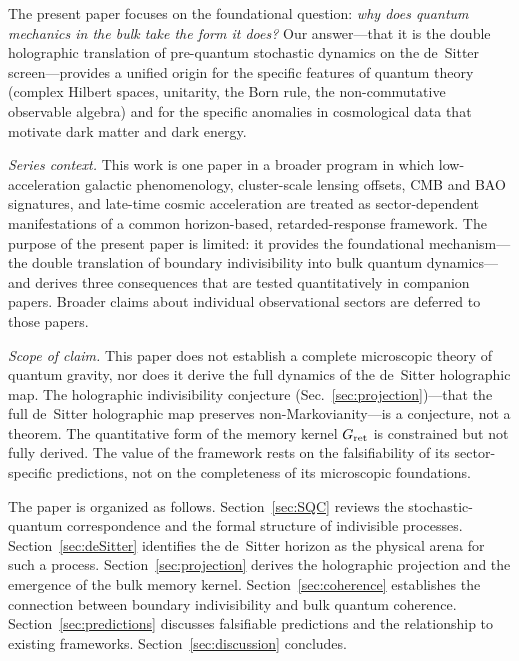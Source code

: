 \documentclass[aps,prd,twocolumn,superscriptaddress,nofootinbib]{revtex4-2}
\begin{document}
The present paper focuses on the foundational question: \emph{why does quantum mechanics in the bulk take the form it does?} Our answer---that it is the double holographic translation of pre-quantum stochastic dynamics on the de~Sitter screen---provides a unified origin for the specific features of quantum theory (complex Hilbert spaces, unitarity, the Born rule, the non-commutative observable algebra) and for the specific anomalies in cosmological data that motivate dark matter and dark energy.

\emph{Series context.} This work is one paper in a broader program in which low-acceleration galactic phenomenology, cluster-scale lensing offsets, CMB and BAO signatures, and late-time cosmic acceleration are treated as sector-dependent manifestations of a common horizon-based, retarded-response framework. The purpose of the present paper is limited: it provides the foundational mechanism---the double translation of boundary indivisibility into bulk quantum dynamics---and derives three consequences that are tested quantitatively in companion papers. Broader claims about individual observational sectors are deferred to those papers.

\emph{Scope of claim.} This paper does not establish a complete microscopic theory of quantum gravity, nor does it derive the full dynamics of the de~Sitter holographic map. The holographic indivisibility conjecture (Sec.~\ref{sec:projection})---that the full de~Sitter holographic map preserves non-Markovianity---is a conjecture, not a theorem. The quantitative form of the memory kernel $G_{\rm ret}$ is constrained but not fully derived. The value of the framework rests on the falsifiability of its sector-specific predictions, not on the completeness of its microscopic foundations.

The paper is organized as follows. Section~\ref{sec:SQC} reviews the stochastic-quantum correspondence and the formal structure of indivisible processes. Section~\ref{sec:deSitter} identifies the de~Sitter horizon as the physical arena for such a process. Section~\ref{sec:projection} derives the holographic projection and the emergence of the bulk memory kernel. Section~\ref{sec:coherence} establishes the connection between boundary indivisibility and bulk quantum coherence. Section~\ref{sec:predictions} discusses falsifiable predictions and the relationship to existing frameworks. Section~\ref{sec:discussion} concludes.



\end{document}
